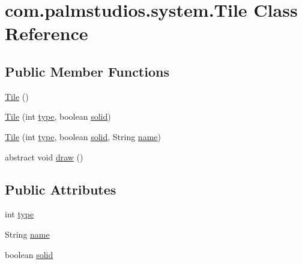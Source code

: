 \hypertarget{classcom_1_1palmstudios_1_1system_1_1_tile}{}\section{com.\+palmstudios.\+system.\+Tile Class Reference}
\label{classcom_1_1palmstudios_1_1system_1_1_tile}
\subsection*{Public Member Functions}
\begin{DoxyCompactItemize}
\item 
\hyperlink{classcom_1_1palmstudios_1_1system_1_1_tile_a737cb577ebba27d436f95e9525748560}{Tile} ()
\item 
\hyperlink{classcom_1_1palmstudios_1_1system_1_1_tile_a72b3fda25e7edae6f3d2bc8d78a70c49}{Tile} (int \hyperlink{classcom_1_1palmstudios_1_1system_1_1_tile_aec9edead9eb404de65c66da3ca1fb452}{type}, boolean \hyperlink{classcom_1_1palmstudios_1_1system_1_1_tile_a6b3888f450ae332b5d7fbdf909472919}{solid})
\item 
\hyperlink{classcom_1_1palmstudios_1_1system_1_1_tile_aa6c4cf5984a0e4090f8ec2bca111658a}{Tile} (int \hyperlink{classcom_1_1palmstudios_1_1system_1_1_tile_aec9edead9eb404de65c66da3ca1fb452}{type}, boolean \hyperlink{classcom_1_1palmstudios_1_1system_1_1_tile_a6b3888f450ae332b5d7fbdf909472919}{solid}, String \hyperlink{classcom_1_1palmstudios_1_1system_1_1_tile_ad3a64c817d4237df857b3c652c883b86}{name})
\item 
abstract void \hyperlink{classcom_1_1palmstudios_1_1system_1_1_tile_af55a96ffc2d33b8259310f89137271a8}{draw} ()
\end{DoxyCompactItemize}
\subsection*{Public Attributes}
\begin{DoxyCompactItemize}
\item 
int \hyperlink{classcom_1_1palmstudios_1_1system_1_1_tile_aec9edead9eb404de65c66da3ca1fb452}{type}
\item 
String \hyperlink{classcom_1_1palmstudios_1_1system_1_1_tile_ad3a64c817d4237df857b3c652c883b86}{name}
\item 
boolean \hyperlink{classcom_1_1palmstudios_1_1system_1_1_tile_a6b3888f450ae332b5d7fbdf909472919}{solid}
\end{DoxyCompactItemize}
